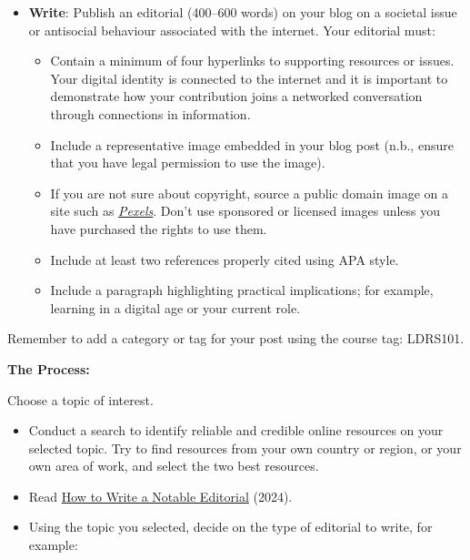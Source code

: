 \documentclass[
  letterpaper,
  DIV=11,
  numbers=noendperiod]{scrreprt}
\providecommand{\tightlist}{%
  \setlength{\itemsep}{0pt}\setlength{\parskip}{0pt}}\usepackage{longtable,booktabs,array}
\begin{document}
\begin{tcolorbox}[enhanced jigsaw, toprule=.15mm, colback=white, colframe=quarto-callout-note-color-frame, bottomtitle=1mm, leftrule=.75mm, coltitle=black, titlerule=0mm, rightrule=.15mm, colbacktitle=quarto-callout-note-color!10!white, left=2mm, title={Learning Activity}, opacitybacktitle=0.6, opacityback=0, breakable, toptitle=1mm, arc=.35mm, bottomrule=.15mm]

\begin{itemize}
\tightlist
\item
  \textbf{Write}: Publish an editorial (400--600 words) on your blog on
  a societal issue or antisocial behaviour associated with the internet.
  Your editorial must:

  \begin{itemize}
  \tightlist
  \item
    Contain a minimum of four hyperlinks to supporting resources or
    issues. Your digital identity is connected to the internet and it is
    important to demonstrate how your contribution joins a networked
    conversation through connections in information.
  \item
    Include a representative image embedded in your blog post (n.b.,
    ensure that you have legal permission to use the image).
  \item
    If you are not sure about copyright, source a public domain image on
    a site such as \href{https://www.pexels.com/}{\emph{Pexels}}. Don't
    use sponsored or licensed images unless you have purchased the
    rights to use them.
  \item
    Include at least two references properly cited using APA style.
  \item
    Include a paragraph highlighting practical implications; for
    example, learning in a digital age or your current role.
  \end{itemize}
\end{itemize}

Remember to add a category or tag for your post using the course tag:
LDRS101.

\textbf{The Process:}

Choose a topic of interest.

\begin{itemize}
\tightlist
\item
  Conduct a search to identify reliable and credible online resources on
  your selected topic. Try to find resources from your own country or
  region, or your own area of work, and select the two best resources.
\item
  Read \href{https://www.wikihow.com/Write-a-Notable-Editorial}{How to
  Write a Notable Editorial} (2024).
\item
  Using the topic you selected, decide on the type of editorial to
  write, for example:


\end{itemize}
\end{tcolorbox}
\end{document}
